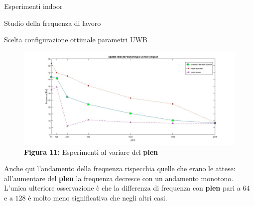 \documentclass[12pt]{report}
\begin{document}
\begin{section}{Esperimenti indoor}
\begin{subsection}{Studio della frequenza di lavoro}
\begin{subsubsection}{Scelta configurazione ottimale parametri UWB}
			\begin{figure}[H]
				\centering
				\includegraphics[scale=0.3]{FreqPlen}
				\caption{\textbf{Figura 11:} Esperimenti al variare del \textbf{plen}\label{FFreqPlen}}
			\end{figure}
			\begin{table}[H]
						\centering
{}
			\end{table}

			Anche qui l'andamento della frequenza rispecchia quelle che erano le attese: all'aumentare del \textbf{plen} la frequenza decresce con un andamento monotono. L'unica ulteriore osservazione è che la differenza di frequenza con \textbf{plen} pari a $64$ e a $128$ è molto meno significativa che negli 								altri casi.\\


\end{subsubsection}
\end{subsection}
\end{section}
\end{document}

